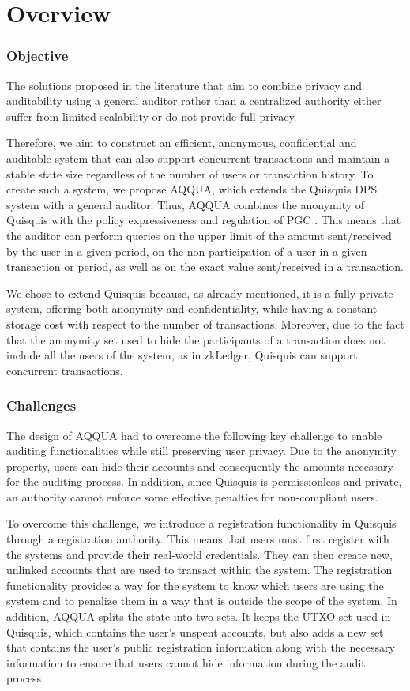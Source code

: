 \section{Overview}

\subsubsection{Objective}
The solutions proposed in the literature that aim to combine privacy and auditability using a general auditor rather than a centralized authority either suffer from limited scalability or do not provide full privacy.

Therefore, we aim to construct an efficient, anonymous, confidential and auditable system that can also support concurrent transactions and maintain a stable state size regardless of the number of users or transaction history. To create such a system, we propose AQQUA, which extends the Quisquis \cite{fauzi2019quisquis} DPS system with a general auditor. Thus, AQQUA combines the anonymity of Quisquis with the policy expressiveness and regulation of PGC \cite{PGC}. This means that the auditor can perform queries on the upper limit of the amount sent/received by the user in a given period, on the non-participation of a user in a given transaction or period, as well as on the exact value sent/received in a transaction.

We chose to extend Quisquis because, as already mentioned, it is a fully private system, offering both anonymity and confidentiality, while having a constant storage cost with respect to the number of transactions. Moreover, due to the fact that the anonymity set used to hide the participants of a transaction does not include all the users of the system, as in zkLedger, Quisquis can support concurrent transactions. 

\subsubsection{Challenges}
The design of AQQUA had to overcome the following key challenge to enable auditing functionalities while still preserving user privacy. Due to the anonymity property, users can hide their accounts and consequently the amounts necessary for the auditing process. In addition, since Quisquis is permissionless and private, an authority cannot enforce some effective penalties for non-compliant users. 

To overcome this challenge, we introduce a registration functionality in Quisquis through a registration authority. This means that users must first register with the systems and provide their real-world credentials. They can then create new, unlinked accounts that are used to transact within the system. The registration functionality provides a way for the system to know which users are using the system and to penalize them in a way that is outside the scope of the system. In addition, AQQUA splits the state into two sets. It keeps the UTXO set used in Quisquis, which contains the user's unspent accounts, but also adds a new set that contains the user's public registration information along with the necessary information to ensure that users cannot hide information during the audit process.
